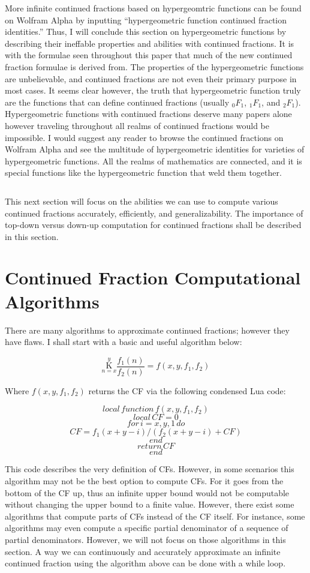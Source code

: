 \documentclass{article}
\begin{document}
More infinite continued fractions based on hypergeomtric functions can be found on Wolfram Alpha by inputting “hypergeometric function continued fraction identities.” Thus, I will conclude this section on hypergeometric functions by describing their ineffable properties and abilities with continued fractions. It is with the formulae seen throughout this paper that much of the new continued fraction formulae is derived from. The properties of the hypergeometric functions are unbelievable, and continued fractions are not even their primary purpose in most cases. It seems clear however, the truth that hypergeometric function truly are the functions that can define continued fractions (usually ${}_0F_1$, ${}_1 F_1$, and ${}_2 F_1$). Hypergeometric functions with continued fractions deserve many papers alone however traveling throughout all realms of continued fractions would be impossible. I would suggest any reader to browse the continued fractions on Wolfram Alpha and see the multitude of hypergeometric identities for varieties of hypergeometric functions. All the realms of mathematics are connected, and it is special functions like the hypergeometric function that weld them together.

${}$

This next section will focus on the abilities we can use to compute various continued fractions accurately, efficiently, and generalizability. The importance of top-down versus down-up computation for continued fractions shall be described in this section.

\section{Continued Fraction Computational Algorithms}

There are many algorithms to approximate continued fractions; however they have flaws. I shall start with a basic and useful algorithm below:

$$\underset{n=x}{\overset{y}{ \mathrm K}} \frac{f_1(n)}{f_2(n)} = f(x,y,f_1,f_2)$$

Where $f(x,y,f_1,f_2)$ returns the CF via the following condensed Lua code:

$$local \, function \, f(x,y,f_1,f_2)$$
$$local \, CF = 0$$
$$for \, i = x, y, 1 \, do$$
$$CF = f_1(x+y-i)/(f_2(x+y-i)+CF)$$
$$end$$
$$return \, CF$$
$$end$$

This code describes the very definition of CFs. However, in some scenarios this algorithm may not be the best option to compute CFs. For it goes from the bottom of the CF up, thus an infinite upper bound would not be computable without changing the upper bound to a finite value. However, there exist some algorithms that compute parts of CFs instead of the CF itself. For instance, some algorithms may even compute a specific partial denominator of a sequence of partial denominators. However, we will not focus on those algorithms in this section. A way we can continuously and accurately approximate an infinite continued fraction using the algorithm above can be done with a while loop.
\end{document}

